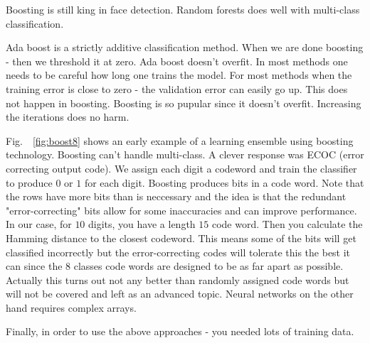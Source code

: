 \documentclass[a4paper]{article}
\begin{document}
Boosting is still king in face detection.  Random forests does well with multi-class classification.

Ada boost is a strictly additive classification method. When we are done boosting - then we threshold it at zero. Ada boost doesn’t overfit. In most methods one needs to be careful how long one trains the model. For most methods when the training error is close to zero - the validation error can easily go up. This does not happen in boosting. Boosting is so pupular since it doesn’t overfit. Increasing the iterations does no harm.

Fig.\ ~\ref{fig:boost8} shows an early example of a learning ensemble using boosting technology. Boosting can't handle multi-class.  A clever response was ECOC (error correcting output code).  We assign each digit a codeword and train the classifier to produce $0$ or $1$ for each digit.  Boosting produces bits in a code word.  Note that the rows have more bits than is neccessary and the idea is that the redundant "error-correcting" bits allow for some inaccuracies and can improve performance. In our case, for $10$ digits, you have a length $15$ code word. Then you calculate the Hamming distance to the closest codeword. This means some of the bits will get classified incorrectly but the error-correcting codes will tolerate this the best it can since the $8$ classes code words are designed to be as far apart as possible. Actually this turns out not any better than randomly assigned code words but will not be covered and left as an advanced topic.
Neural networks on the other hand requires complex arrays.

Finally, in order to use the above approaches - you needed lots of training data. 
\end{document}
